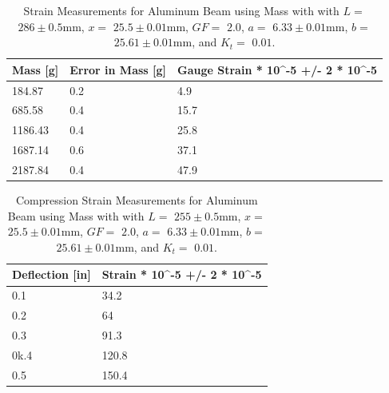 \documentclass[]{article}
\newcommand{\xOne}{\ensuremath{25.5 \pm 0.01 \si{\milli\meter}}}
\newcommand{\GF}{\ensuremath{2.0}}
\newcommand{\Kt}{\ensuremath{0.01}}
\newcommand{\LOne}{\ensuremath{255 \pm 0.5 \si{\milli\meter}}}
\newcommand{\LTwo}{\ensuremath{286 \pm 0.5 \si{\milli\meter}}}
\newcommand{\aOne}{\ensuremath{6.33 \pm 0.01 \si{\milli\meter}}}
\newcommand{\bOne}{\ensuremath{25.61 \pm 0.01 \si{\milli\meter}}}
\begin{document}
\begin{table}[H]
    \caption{Strain Measurements for Aluminum Beam using Mass with with
    $L=$ \LTwo, $x=$ \xOne, $GF= $ \GF, $a= $ \aOne, $b= $\bOne, and $K_t=$ \Kt.
    }\label{tab:strain2}
    \begin{tabular}{@{}lll@{}}
        \toprule
        Mass [g] & Error in Mass [g] & Gauge Strain  * 10\textasciicircum -5 +/- 2 * 10\textasciicircum -5 \\ \midrule
        184.87       & 0.2                   & 4.9                                                                 \\
        685.58       & 0.4                   & 15.7                                                                \\
        1186.43      & 0.4                   & 25.8                                                                \\
        1687.14      & 0.6                   & 37.1                                                                \\
        2187.84      & 0.4                   & 47.9                                                                \\ \bottomrule
    \end{tabular}
\end{table}

\begin{table}[H]
    \caption{Compression Strain Measurements for Aluminum Beam using Mass with with
    $L=$ \LOne, $x=$ \xOne, $GF= $ \GF, $a= $ \aOne, $b= $\bOne, and $K_t=$ \Kt.
    }\label{tab:strain3}
    \begin{tabular}{@{}ll@{}}
        \toprule
        Deflection [in] & Strain *  10\textasciicircum -5 +/- 2 * 10\textasciicircum -5 \\ \midrule
        0.1                 & 34.2                                                          \\
        0.2                 & 64                                                            \\
        0.3                 & 91.3                                                          \\
        0k.4                 & 120.8                                                         \\
        0.5                 & 150.4                                                         \\ \bottomrule
    \end{tabular}
\end{table}
\end{document}
